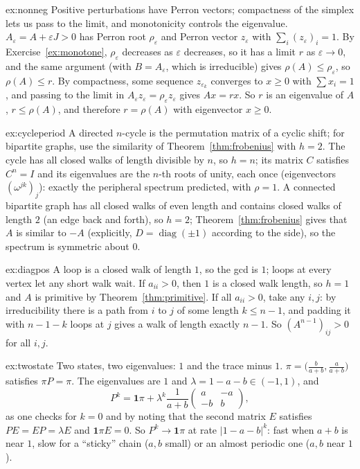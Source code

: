 \begin{solution}{ex:nonneg}
\idea Positive perturbations have Perron vectors; compactness of the simplex lets us pass to the limit, and monotonicity
controls the eigenvalue.
\writeup $A_\varepsilon=A+\varepsilon J>0$ has Perron root $\rho_\varepsilon$ and Perron vector $z_\varepsilon$ with $\sum_i
(z_\varepsilon)_i=1$. By Exercise~\ref{ex:monotone}, $\rho_\varepsilon$ decreases as $\varepsilon$ decreases, so it has a limit $r$
as $\varepsilon\to0$, and the same argument (with $B=A_\varepsilon$, which is irreducible) gives $\rho(A)\le\rho_\varepsilon$, so
$\rho(A)\le r$. By compactness, some sequence $z_{\varepsilon_k}$ converges to $x\ge0$ with $\sum x_i=1$, and passing to the limit in
$A_\varepsilon z_\varepsilon=\rho_\varepsilon z_\varepsilon$ gives $Ax=rx$. So $r$ is an eigenvalue of $A$, $r\le\rho(A)$, and
therefore $r=\rho(A)$ with eigenvector $x\ge0$.
\end{solution}

\begin{solution}{ex:cycleperiod}
\idea A directed $n$-cycle is the permutation matrix of a cyclic shift; for bipartite graphs, use the similarity of
Theorem~\ref{thm:frobenius} with $h=2$.
\writeup The cycle has all closed walks of length divisible by $n$, so $h=n$; its matrix $C$ satisfies $C^n=I$ and its
eigenvalues are the $n$-th roots of unity, each once (eigenvectors $(\omega^{jk})_j$): exactly the peripheral spectrum predicted,
with $\rho=1$. A connected bipartite graph has all closed walks of even length and contains closed walks of length $2$ (an
edge back and forth), so $h=2$; Theorem~\ref{thm:frobenius} gives that $A$ is similar to $-A$ (explicitly, $D=\operatorname{diag}
(\pm1)$ according to the side), so the spectrum is symmetric about $0$.
\end{solution}

\begin{solution}{ex:diagpos}
\idea A loop is a closed walk of length $1$, so the gcd is $1$; loops at every vertex let any short walk wait.
\writeup If $a_{ii}>0$, then $1$ is a closed walk length, so $h=1$ and $A$ is primitive by Theorem~\ref{thm:primitive}. If
all $a_{ii}>0$, take any $i,j$: by irreducibility there is a path from $i$ to $j$ of some length $k\le n-1$, and padding it with
$n-1-k$ loops at $j$ gives a walk of length exactly $n-1$. So $(A^{n-1})_{ij}>0$ for all $i,j$.
\end{solution}

\begin{solution}{ex:twostate}
\idea Two states, two eigenvalues: $1$ and the trace minus $1$.
\writeup $\pi=\bigl(\frac b{a+b},\frac a{a+b}\bigr)$ satisfies $\pi P=\pi$. The eigenvalues are $1$ and $\lambda=1-a-b\in(-1,1)$,
and
\[
P^k=\mathbf 1\pi+\lambda^k\frac1{a+b}\begin{pmatrix}a&-a\\-b&b\end{pmatrix},
\]
as one checks for $k=0$ and by noting that the second matrix $E$ satisfies $PE=EP=\lambda E$ and $\mathbf 1\pi E=0$. So
$P^k\to\mathbf 1\pi$ at rate $|1-a-b|^k$: fast when $a+b$ is near $1$, slow for a ``sticky'' chain ($a,b$ small) or an almost
periodic one ($a,b$ near $1$).
\end{solution}

